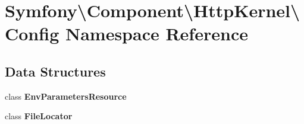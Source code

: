 \section{Symfony\textbackslash{}Component\textbackslash{}Http\+Kernel\textbackslash{}Config Namespace Reference}
\label{namespace_symfony_1_1_component_1_1_http_kernel_1_1_config}
\subsection*{Data Structures}
\begin{DoxyCompactItemize}
\item 
class {\bf Env\+Parameters\+Resource}
\item 
class {\bf File\+Locator}
\end{DoxyCompactItemize}
